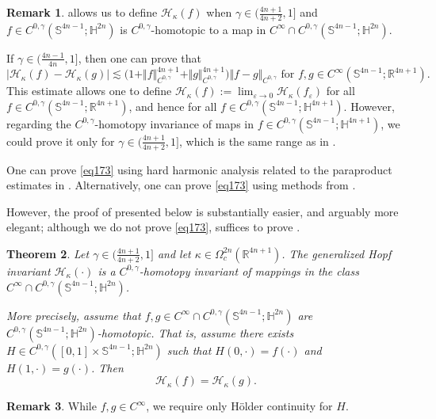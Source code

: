 \documentclass[intlimits,12pt,reqno]{amsart}
\newcommand{\Sph}{\mathbb S}
\newcommand{\bbbh}{\mathbb H}
\newcommand{\R}{\mathbb R}
\newcommand{\eps}{\varepsilon}
\numberwithin{equation}{section}
\newtheorem{theorem}{Theorem}[section]
\theoremstyle{definition}
\newtheorem{remark}[theorem]{Remark}
\newcommand{\HI}{\mathcal{H}}
\begin{document}
\begin{remark}
\label{R12}
 allows us to define $\HI_\kappa(f)$ when 
$\gamma\in\big(\frac{4n+1}{4n+2},1\big]$ and 
$f\in C^{0,\gamma}(\Sph^{4n-1};\bbbh^{2n})$ is $C^{0,\gamma}$-homotopic to a map in $C^\infty\cap C^{0,\gamma}(\Sph^{4n-1};\bbbh^{2n})$.
 
If $\gamma\in\big(\frac{4n-1}{4n},1\big]$, then one can prove that
\begin{equation}
\label{eq173}
|\HI_\kappa(f)-\HI_\kappa(g)|\lesssim
\big(1+\Vert f\Vert_{C^{0,\gamma}}^{4n+1}+\Vert g\Vert_{C^{0,\gamma}}^{4n+1}\big)\Vert f-g\Vert_{C^{0,\gamma}}
\text{ for }
f,g\in C^\infty(\Sph^{4n-1};\R^{4n+1}).
\end{equation}
This estimate allows one to define $\HI_\kappa(f):=\lim_{\eps\to 0}\HI_\kappa(f_\eps)$ for all $f\in C^{0,\gamma}(\Sph^{4n-1};\R^{4n+1})$, and hence for all $f\in C^{0,\gamma}(\Sph^{4n-1};\bbbh^{4n+1})$. However, regarding the $C^{0,\gamma}$-homotopy invariance of maps in $f\in C^{0,\gamma}(\Sph^{4n-1};\bbbh^{4n+1})$, we could prove it only for $\gamma\in\big(\frac{4n+1}{4n+2},1\big]$, which is the same range as in . 

One can prove \eqref{eq173} using hard harmonic analysis related to the paraproduct estimates in \cite{SY1999,LS19}. Alternatively, one can prove \eqref{eq173} using methods from \cite{SVS}.

However, the proof of  presented below is substantially easier, and arguably more elegant; although we do not prove \eqref{eq173},  suffices to prove .
\end{remark}
\begin{theorem}
\label{pr:homotopy}
Let $\gamma\in\big(\frac{4n+1}{4n+2},1\big]$ and let $\kappa\in \Omega_c^{2n}(\R^{4n+1})$. The generalized Hopf invariant $\HI_\kappa(\cdot)$ 
is a $C^{0,\gamma}$-homotopy invariant of mappings in the class $C^\infty\cap C^{0,\gamma}(\Sph^{4n-1};\mathbb{H}^{2n})$.

More precisely, assume that $f,g \in C^\infty\cap C^{0,\gamma}(\mathbb{S}^{4n-1};\mathbb{H}^{2n})$ are $C^{0,\gamma}(\mathbb{S}^{4n-1};\mathbb{H}^{2n})$-homotopic. That is, assume there exists $H \in C^{0,\gamma}([0,1] \times \mathbb{S}^{4n-1}; \mathbb{H}^{2n})$ such that $H(0,\cdot) = f(\cdot)$ and $H(1,\cdot) = g(\cdot)$. Then
\[
 \mathcal{H}_\kappa(f) = \mathcal{H}_\kappa(g).
\]
\end{theorem}
\begin{remark}
While $f,g\in C^\infty$, we require only H\"older continuity for $H$.
\end{remark}
\end{document}

